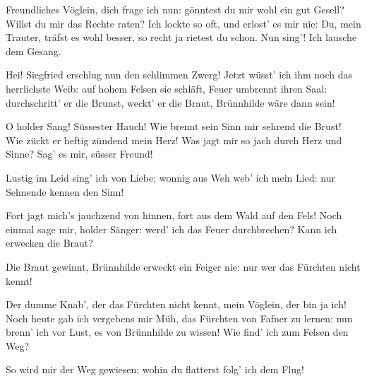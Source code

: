 \begin{drama}

Freundliches Vöglein,
dich frage ich nun:
gönntest du mir
wohl ein gut Gesell?
Willst du mir das Rechte raten?
Ich lockte so oft,
und erlost' es mir nie:
Du, mein Trauter,
träfst es wohl besser,
so recht ja rietest du schon.
Nun sing'! Ich lausche dem Gesang.

Hei! Siegfried erschlug
nun den schlimmen Zwerg!
Jetzt wüsst' ich ihm noch
das herrlichste Weib:
auf hohem Felsen sie schläft,
Feuer umbrennt ihren Saal:
durchschritt' er die Brunst,
weckt' er die Braut,
Brünnhilde wäre dann sein!

\Siegfriedspeaks


O holder Sang!
Süssester Hauch!
Wie brennt sein Sinn
mir sehrend die Brust!
Wie zückt er heftig
zündend mein Herz!
Was jagt mir so jach
durch Herz und Sinne?
Sag' es mir, süsser Freund!


Lustig im Leid
sing' ich von Liebe;
wonnig aus Weh
web' ich mein Lied:
nur Sehnende kennen den Sinn!

\Siegfriedspeaks

Fort jagt mich's
jauchzend von hinnen,
fort aus dem Wald auf den Fels!
Noch einmal sage mir,
holder Sänger:
werd' ich das Feuer durchbrechen?
Kann ich erwecken die Braut?


Die Braut gewinnt,
Brünnhilde erweckt
ein Feiger nie:
nur wer das Fürchten nicht kennt!

\Siegfriedspeaks


Der dumme Knab',
der das Fürchten nicht kennt,
mein Vöglein, der bin ja ich!
Noch heute gab ich
vergebens mir Müh,
das Fürchten von Fafner zu lernen:
nun brenn' ich vor Lust,
es von Brünnhilde zu wissen!
Wie find' ich zum Felsen den Weg?


So wird mir der Weg gewiesen:
wohin du flatterst
folg' ich dem Flug!



\end{drama}
